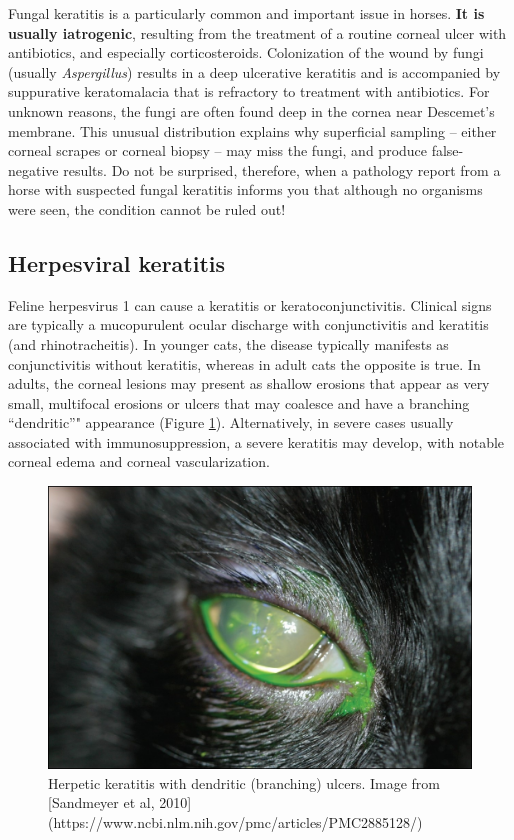 \documentclass[openany]{article}
\begin{document}
Fungal keratitis is a particularly common and important issue in horses.
\textbf{It is usually iatrogenic}, resulting from the treatment of a
routine corneal ulcer with antibiotics, and especially corticosteroids.
Colonization of the wound by fungi (usually \emph{Aspergillus}) results
in a deep ulcerative keratitis and is accompanied by suppurative
keratomalacia that is refractory to treatment with antibiotics. For
unknown reasons, the fungi are often found deep in the cornea near
Descemet's membrane. This unusual distribution explains why superficial
sampling -- either corneal scrapes or corneal biopsy -- may miss the
fungi, and produce false-negative results. Do not be surprised,
therefore, when a pathology report from a horse with suspected fungal
keratitis informs you that although no organisms were seen, the
condition cannot be ruled out!

\subsection{Herpesviral keratitis}\label{herpesviral-keratitis}

Feline herpesvirus 1 can cause a keratitis or keratoconjunctivitis.
Clinical signs are typically a mucopurulent ocular discharge with
conjunctivitis and keratitis (and rhinotracheitis). In younger cats, the
disease typically manifests as conjunctivitis without keratitis, whereas
in adult cats the opposite is true. In adults, the corneal lesions may
present as shallow erosions that appear as very small, multifocal
erosions or ulcers that may coalesce and have a branching ``dendritic''"
appearance (Figure \ref{fig:dendritic}). Alternatively, in severe cases
usually associated with immunosuppression, a severe keratitis may
develop, with notable corneal edema and corneal vascularization.

\begin{figure}

{\centering \includegraphics{images/dendritic_ulcer_feline} 

}

\caption{Herpetic keratitis with dendritic (branching) ulcers. Image from [Sandmeyer et al, 2010](https://www.ncbi.nlm.nih.gov/pmc/articles/PMC2885128/)}\label{fig:dendritic}
\end{figure}
\end{document}
